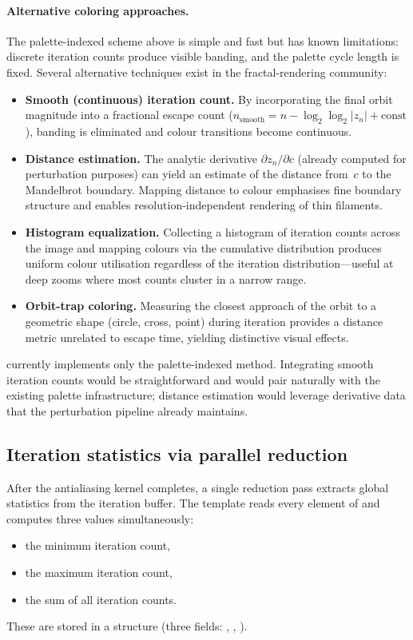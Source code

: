 \paragraph{Alternative coloring approaches.}
The palette-indexed scheme above is simple and fast but has known
limitations: discrete iteration counts produce visible banding, and
the palette cycle length is fixed.  Several alternative techniques
exist in the fractal-rendering community:
\begin{itemize}
  \item \textbf{Smooth (continuous) iteration count.}  By incorporating
    the final orbit magnitude into a fractional escape count
    ($n_{\text{smooth}} = n - \log_2\!\log_2|z_n| + \text{const}$),
    banding is eliminated and colour transitions become continuous.
  \item \textbf{Distance estimation.}  The analytic derivative
    $\partial z_n/\partial c$ (already computed for perturbation
    purposes) can yield an estimate of the distance from~$c$ to the
    Mandelbrot boundary.  Mapping distance to colour emphasises fine
    boundary structure and enables resolution-independent rendering of
    thin filaments.
  \item \textbf{Histogram equalization.}  Collecting a histogram of
    iteration counts across the image and mapping colours via the
    cumulative distribution produces uniform colour utilisation
    regardless of the iteration distribution---useful at deep zooms
    where most counts cluster in a narrow range.
  \item \textbf{Orbit-trap coloring.}  Measuring the closest approach
    of the orbit to a geometric shape (circle, cross, point) during
    iteration provides a distance metric unrelated to escape time,
    yielding distinctive visual effects.
\end{itemize}
\FractalShark{} currently implements only the palette-indexed method.
Integrating smooth iteration counts would be straightforward and would
pair naturally with the existing palette infrastructure; distance
estimation would leverage derivative data that the perturbation
pipeline already maintains.

\subsection{Iteration statistics via parallel reduction}
\label{subsec:reduction}

After the antialiasing kernel completes, a single reduction pass
extracts global statistics from the iteration buffer.  The
 template reads every element of
 and computes three values simultaneously:
\begin{itemize}
  \item the minimum iteration count,
  \item the maximum iteration count,
  \item the sum of all iteration counts.
\end{itemize}
These are stored in a  structure
(three  fields: , , ).

